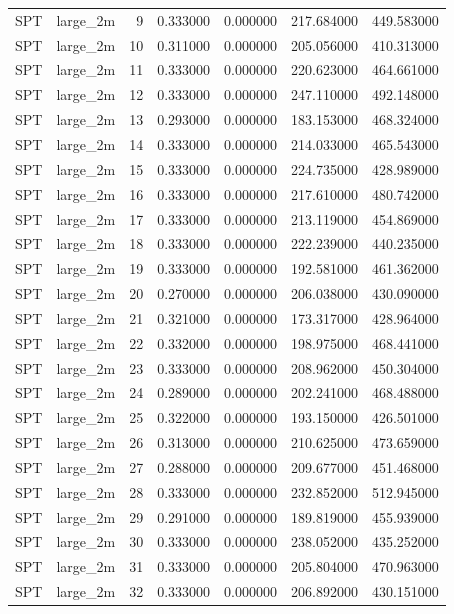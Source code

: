 \begin{tabular}{llrrrrr}
SPT & large_2m & 9 & 0.333000 & 0.000000 & 217.684000 & 449.583000 \\
SPT & large_2m & 10 & 0.311000 & 0.000000 & 205.056000 & 410.313000 \\
SPT & large_2m & 11 & 0.333000 & 0.000000 & 220.623000 & 464.661000 \\
SPT & large_2m & 12 & 0.333000 & 0.000000 & 247.110000 & 492.148000 \\
SPT & large_2m & 13 & 0.293000 & 0.000000 & 183.153000 & 468.324000 \\
SPT & large_2m & 14 & 0.333000 & 0.000000 & 214.033000 & 465.543000 \\
SPT & large_2m & 15 & 0.333000 & 0.000000 & 224.735000 & 428.989000 \\
SPT & large_2m & 16 & 0.333000 & 0.000000 & 217.610000 & 480.742000 \\
SPT & large_2m & 17 & 0.333000 & 0.000000 & 213.119000 & 454.869000 \\
SPT & large_2m & 18 & 0.333000 & 0.000000 & 222.239000 & 440.235000 \\
SPT & large_2m & 19 & 0.333000 & 0.000000 & 192.581000 & 461.362000 \\
SPT & large_2m & 20 & 0.270000 & 0.000000 & 206.038000 & 430.090000 \\
SPT & large_2m & 21 & 0.321000 & 0.000000 & 173.317000 & 428.964000 \\
SPT & large_2m & 22 & 0.332000 & 0.000000 & 198.975000 & 468.441000 \\
SPT & large_2m & 23 & 0.333000 & 0.000000 & 208.962000 & 450.304000 \\
SPT & large_2m & 24 & 0.289000 & 0.000000 & 202.241000 & 468.488000 \\
SPT & large_2m & 25 & 0.322000 & 0.000000 & 193.150000 & 426.501000 \\
SPT & large_2m & 26 & 0.313000 & 0.000000 & 210.625000 & 473.659000 \\
SPT & large_2m & 27 & 0.288000 & 0.000000 & 209.677000 & 451.468000 \\
SPT & large_2m & 28 & 0.333000 & 0.000000 & 232.852000 & 512.945000 \\
SPT & large_2m & 29 & 0.291000 & 0.000000 & 189.819000 & 455.939000 \\
SPT & large_2m & 30 & 0.333000 & 0.000000 & 238.052000 & 435.252000 \\
SPT & large_2m & 31 & 0.333000 & 0.000000 & 205.804000 & 470.963000 \\
SPT & large_2m & 32 & 0.333000 & 0.000000 & 206.892000 & 430.151000 \\

\end{tabular}
